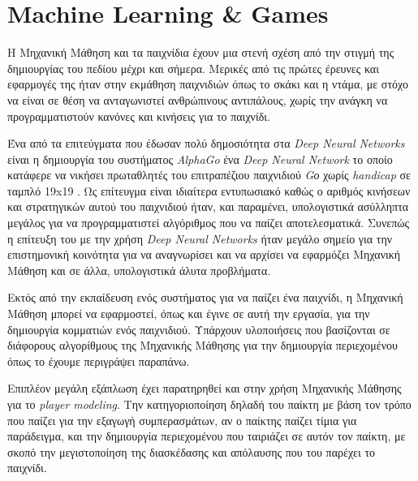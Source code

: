 \section{Machine Learning \& Games}
Η Μηχανική Μάθηση και τα παιχνίδια έχουν μια στενή σχέση από την στιγμή της δημιουργίας του πεδίου μέχρι και σήμερα. Μερικές από τις πρώτες έρευνες και εφαρμογές της ήταν στην εκμάθηση παιχνιδιών όπως το σκάκι και η ντάμα, με στόχο να είναι σε θέση να ανταγωνιστεί ανθρώπινους αντιπάλους, χωρίς την ανάγκη να προγραμματιστούν κανόνες και κινήσεις για το παιχνίδι.
\par
Ένα από τα επιτεύγματα που έδωσαν πολύ δημοσιότητα στα \textit{Deep Neural Networks} είναι η δημιουργία του συστήματος \textit{AlphaGo} ένα \textit{Deep Neural Network} το οποίο κατάφερε να νικήσει πρωταθλητές του επιτραπέζιου παιχνιδιού \textit{Gο} χωρίς \textit{handicap} σε ταμπλό 19x19 \cite{alphago}. Ως επίτευγμα είναι ιδιαίτερα εντυπωσιακό καθώς ο αριθμός κινήσεων και στρατηγικών αυτού του παιχνιδιού ήταν, και παραμένει, υπολογιστικά ασύλληπτα μεγάλος για να προγραμματιστεί αλγόριθμος που να παίζει αποτελεσματικά. Συνεπώς η επίτευξη του με την χρήση \textit{Deep Neural Networks} ήταν μεγάλο σημείο για την επιστημονική κοινότητα για να αναγνωρίσει και να αρχίσει να εφαρμόζει Μηχανική Μάθηση και σε άλλα, υπολογιστικά άλυτα προβλήματα.
\par
Εκτός από την εκπαίδευση ενός συστήματος για να παίζει ένα παιχνίδι, η Μηχανική Μάθηση μπορεί να εφαρμοστεί, όπως και έγινε σε αυτή την εργασία, για την δημιουργία κομματιών ενός παιχνιδιού. Υπάρχουν υλοποιήσεις που βασίζονται σε διάφορους αλγορίθμους της Μηχανικής Μάθησης για την δημιουργία περιεχομένου όπως το έχουμε περιγράψει παραπάνω.
\par
Επιπλέον μεγάλη εξάπλωση έχει παρατηρηθεί και στην χρήση Μηχανικής Μάθησης για το \textit{player modeling}. Την κατηγοριοποίηση δηλαδή του παίκτη με βάση τον τρόπο που παίζει για την εξαγωγή συμπερασμάτων, αν ο παίκτης παίζει τίμια για παράδειγμα, και την δημιουργία περιεχομένου που ταιριάζει σε αυτόν τον παίκτη, με σκοπό την μεγιστοποίηση της διασκέδασης και απόλαυσης που του παρέχει το παιχνίδι. 


